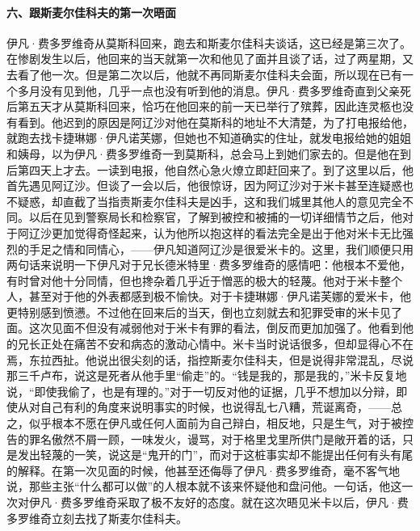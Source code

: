 \paragraph*{六、跟斯麦尔佳科夫的第一次晤面}
\par 伊凡·费多罗维奇从莫斯科回来，跑去和斯麦尔佳科夫谈话，这已经是第三次了。在惨剧发生以后，他回来的当天就第一次和他见了面并且谈了话，过了两星期，又去看了他一次。但是第二次以后，他就不再同斯麦尔佳科夫会面，所以现在已有一个多月没有见到他，几乎一点也没有听到他的消息。伊凡·费多罗维奇直到父亲死后第五天才从莫斯科回来，恰巧在他回来的前一天已举行了殡葬，因此连灵柩也没有看到。他迟到的原因是阿辽沙对他在莫斯科的地址不大清楚，为了打电报给他，就跑去找卡捷琳娜·伊凡诺芙娜，但她也不知道确实的住址，就发电报给她的姐姐和姨母，以为伊凡·费多罗维奇一到莫斯科，总会马上到她们家去的。但是他在到后第四天上才去。一读到电报，他自然心急火燎立即赶回来了。到了这里以后，他首先遇见阿辽沙。但谈了一会以后，他很惊讶，因为阿辽沙对于米卡甚至连疑惑也不疑惑，却直截了当指责斯麦尔佳科夫是凶手，这和我们城里其他人的意见完全不同。以后在见到警察局长和检察官，了解到被控和被捕的一切详细情节之后，他对于阿辽沙更加觉得奇怪起来，认为他所以抱这样的看法完全是出于他对米卡无比强烈的手足之情和同情心，——伊凡知道阿辽沙是很爱米卡的。这里，我们顺便只用两句话来说明一下伊凡对于兄长德米特里·费多罗维奇的感情吧：他根本不爱他，有时曾对他十分同情，但也搀杂着几乎近于憎恶的极大的轻蔑。他对于米卡整个人，甚至对于他的外表都感到极不愉快。对于卡捷琳娜·伊凡诺芙娜的爱米卡，他更特别感到愤懑。不过他在回来后的当天，倒也立刻就去和犯罪受审的米卡见了面。这次见面不但没有减弱他对于米卡有罪的看法，倒反而更加加强了。他看到他的兄长正处在痛苦不安和病态的激动心情中。米卡当时说话很多，但却显得心不在焉，东拉西扯。他说出很尖刻的话，指控斯麦尔佳科夫，但是说得非常混乱，尽说那三千卢布，说这是死者从他手里“偷走”的。“钱是我的，那是我的，”米卡反复地说，“即使我偷了，也是有理的。”对于一切反对他的证据，几乎不想加以分辩，即使从对自己有利的角度来说明事实的时候，也说得乱七八糟，荒诞离奇，——总之，似乎根本不愿在伊凡或任何人面前为自己辩白，相反地，只是生气，对于被控告的罪名傲然不屑一顾，一味发火，谩骂，对于格里戈里所供门是敞开着的话，只是发出轻蔑的一笑，说这是“鬼开的门”，而对于这桩事实却不能提出任何有头有尾的解释。在第一次见面的时候，他甚至还侮辱了伊凡·费多罗维奇，毫不客气地说，那些主张“什么都可以做”的人根本就不该来怀疑他和盘问他。一句话，他这一次对伊凡·费多罗维奇采取了极不友好的态度。就在这次晤见米卡以后，伊凡·费多罗维奇立刻去找了斯麦尔佳科夫。
